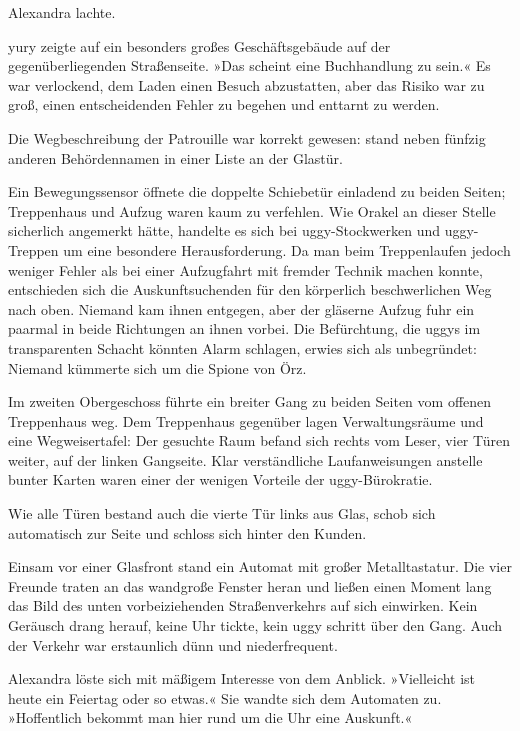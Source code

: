  Alexandra lachte. 

yury zeigte auf ein besonders großes Geschäftsgebäude auf der gegenüberliegenden Straßenseite. »Das scheint eine Buchhandlung zu sein.« Es war verlockend, dem Laden einen Besuch abzustatten, aber das Risiko war zu groß, einen entscheidenden Fehler zu begehen und enttarnt zu werden.

Die Wegbeschreibung der Patrouille war korrekt gewesen:  stand neben fünfzig anderen Behördennamen in einer Liste an der Glastür. 

Ein Bewegungssensor öffnete die doppelte Schiebetür einladend zu beiden Seiten; Treppenhaus und Aufzug waren kaum zu verfehlen. Wie Orakel an dieser Stelle sicherlich angemerkt hätte, handelte es sich bei uggy-Stockwerken und uggy-Treppen um eine besondere Herausforderung. Da man beim Treppenlaufen jedoch weniger Fehler als bei einer Aufzugfahrt mit fremder Technik machen konnte, entschieden sich die Auskunftsuchenden für den körperlich beschwerlichen Weg nach oben. Niemand kam ihnen entgegen, aber der gläserne Aufzug fuhr ein paarmal in beide Richtungen an ihnen vorbei. Die Befürchtung, die uggys im transparenten Schacht könnten Alarm schlagen, erwies sich als unbegründet: Niemand kümmerte sich um die Spione von Örz.

Im zweiten Obergeschoss führte ein breiter Gang zu beiden Seiten vom offenen Treppenhaus weg. Dem Treppenhaus gegenüber lagen Verwaltungsräume und eine Wegweisertafel: Der gesuchte Raum befand sich rechts vom Leser, vier Türen weiter, auf der linken Gangseite. Klar verständliche Laufanweisungen anstelle bunter Karten waren einer der wenigen Vorteile der uggy-Bürokratie.

Wie alle Türen bestand auch die vierte Tür links aus Glas, schob sich automatisch zur Seite und schloss sich hinter den Kunden.

Einsam vor einer Glasfront stand ein Automat mit großer Metalltastatur. Die vier Freunde traten an das wandgroße Fenster heran und ließen einen Moment lang das Bild des unten vorbeiziehenden Straßenverkehrs auf sich einwirken. Kein Geräusch drang herauf, keine Uhr tickte, kein uggy schritt über den Gang. Auch der Verkehr war erstaunlich dünn und niederfrequent.

Alexandra löste sich mit mäßigem Interesse von dem Anblick. »Vielleicht ist heute ein Feiertag oder so etwas.« Sie wandte sich dem Automaten zu. »Hoffentlich bekommt man hier rund um die Uhr eine Auskunft.«


